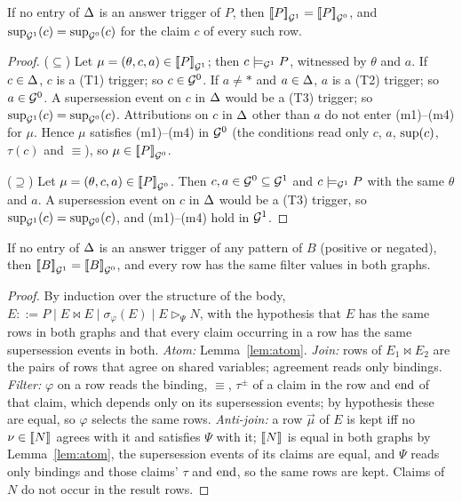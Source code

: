 \begin{lemma}\label{lem:atom}
If no entry of $\Delta$ is an answer trigger of $P$, then
$[\![P]\!]_{\mathcal G^1}^{}=[\![P]\!]_{\mathcal G^0}^{}$, and $\mathrm{sup}_{\mathcal G^1}(c)=\mathrm{sup}_{\mathcal G^0}(c)$ for the claim $c$ of
every such row.
\end{lemma}
\begin{proof}
($\subseteq$) Let $\mu=(\theta,c,a)\in[\![P]\!]_{\mathcal G^1}^{}$; then $c\models_{\mathcal G^1}P$, witnessed by
$\theta$ and $a$. If $c\in\Delta$, $c$ is a (T1) trigger; so $c\in\mathcal G^0$. If $a\neq\ast$ and
$a\in\Delta$, $a$ is a (T2) trigger; so $a\in\mathcal G^0$. A supersession event on $c$ in $\Delta$ would be a
(T3) trigger; so $\mathrm{sup}_{\mathcal G^1}(c)=\mathrm{sup}_{\mathcal G^0}(c)$. Attributions on $c$ in $\Delta$ other than $a$
do not enter (m1)--(m4) for $\mu$. Hence $\mu$ satisfies (m1)--(m4) in $\mathcal G^0$ (the conditions read
only $c$, $a$, $\mathrm{sup}(c)$, $\tau(c)$ and $\equiv$), so $\mu\in[\![P]\!]_{\mathcal G^0}^{}$.

($\supseteq$) Let $\mu=(\theta,c,a)\in[\![P]\!]_{\mathcal G^0}^{}$. Then $c,a\in\mathcal G^0\subseteq\mathcal G^1$ and
$c\models_{\mathcal G^1}P$ with the same $\theta$ and $a$. A supersession event on $c$ in $\Delta$ would be
a (T3) trigger, so $\mathrm{sup}_{\mathcal G^1}(c)=\mathrm{sup}_{\mathcal G^0}(c)$, and (m1)--(m4) hold in $\mathcal G^1$.
\end{proof}

\begin{lemma}[Body]\label{lem:body}
If no entry of $\Delta$ is an answer trigger of any pattern of $B$ (positive or negated), then
$[\![B]\!]_{\mathcal G^1}^{}=[\![B]\!]_{\mathcal G^0}^{}$, and every row has the same filter values in both graphs.
\end{lemma}
\begin{proof}
By induction over the structure of the body, $E::=P\mid E\bowtie E\mid\sigma_\varphi(E)\mid
E\rhd_\Psi N$, with the hypothesis that $E$ has the same rows in both graphs and that every
claim occurring in a row has the same supersession events in both.
\emph{Atom:} Lemma~\ref{lem:atom}.
\emph{Join:} rows of $E_1\bowtie E_2$ are the pairs of rows that agree on shared variables;
agreement reads only bindings.
\emph{Filter:} $\varphi$ on a row reads the binding, $\equiv$, $\tau^\pm$ of a claim in the row and
$\mathrm{end}$ of that claim, which depends only on its supersession events; by hypothesis these are
equal, so $\varphi$ selects the same rows.
\emph{Anti-join:} a row $\vec\mu$ of $E$ is kept iff no $\nu\in[\![N]\!]_{}^{}$ agrees with it and
satisfies $\Psi$ with it; $[\![N]\!]_{}^{}$ is equal in both graphs by Lemma~\ref{lem:atom}, the
supersession events of its claims are equal, and $\Psi$ reads only bindings and those claims'
$\tau$ and $\mathrm{end}$, so the same rows are kept. Claims of $N$ do not occur in the result rows.
\end{proof}

